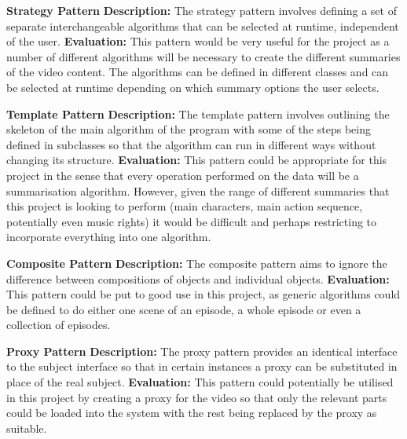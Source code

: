 \textbf{Strategy Pattern}
\newline
\textbf{Description:} The strategy pattern involves defining a set of separate interchangeable algorithms that can be selected at runtime, 
independent of the user. 
\newline
\textbf{Evaluation:} This pattern would be very useful for the project as a number of different algorithms will be necessary to create the different summaries of the video content. The algorithms can be defined in different classes and can be selected at runtime depending on which summary options the user selects.

\textbf{Template Pattern}
\newline
\textbf{Description:} The template pattern involves outlining the skeleton of the main algorithm of the program with some of the steps being defined in subclasses so that the algorithm can run in different ways without changing its structure. 
\newline
\textbf{Evaluation:} This pattern could be appropriate for this project in the sense that every operation performed on the data will be a 
summarisation algorithm. However, given the range of different summaries that this project is looking to perform 
(main characters, main action sequence, potentially even music rights) it would be difficult and perhaps restricting to 
incorporate everything into one algorithm. 

\textbf{Composite Pattern}
\newline
\textbf{Description:} The composite pattern aims to ignore the difference between compositions of objects and individual objects. 
\newline
\textbf{Evaluation:} This pattern could be put to good use in this project, as generic algorithms could be defined to do either one scene of an episode,
a whole episode or even a collection of episodes.  

\textbf{Proxy Pattern}
\newline
\textbf{Description:} The proxy pattern provides an identical interface to the subject interface so that in certain instances a proxy can be substituted in place of the real subject.
\newline
\textbf{Evaluation:} This pattern could potentially be utilised in this project by creating a proxy for the video so that only the relevant parts could be loaded into the system with the rest being replaced by the proxy as suitable. 

